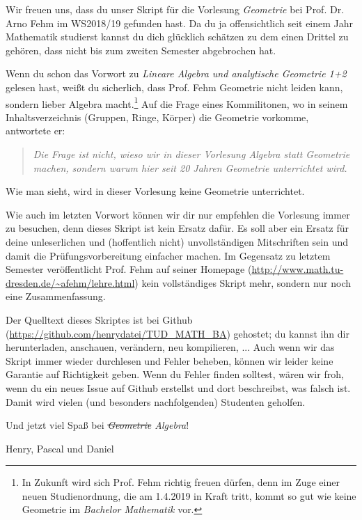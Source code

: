 Wir freuen uns, dass du unser Skript für die Vorlesung \textit{Geometrie} bei Prof. Dr. Arno Fehm im WS2018/19 gefunden hast. Da du ja offensichtlich seit einem Jahr Mathematik studierst kannst du dich glücklich schätzen zu dem einen Drittel zu gehören, dass nicht bis zum zweiten Semester abgebrochen hat.

Wenn du schon das Vorwort zu \textit{Lineare Algebra und analytische Geometrie 1+2} gelesen hast, weißt du sicherlich, dass Prof. Fehm Geometrie nicht leiden kann, sondern lieber Algebra macht.\footnote{In Zukunft wird sich Prof. Fehm richtig freuen dürfen, denn im Zuge einer neuen Studienordnung, die am 1.4.2019 in Kraft tritt, kommt so gut wie keine Geometrie im \textit{Bachelor Mathematik} vor.} Auf die Frage eines Kommilitonen, wo in seinem Inhaltsverzeichnis (Gruppen, Ringe, Körper) die Geometrie vorkomme, antwortete er:
\begin{quote}
	\textit{Die Frage ist nicht, wieso wir in dieser Vorlesung Algebra statt Geometrie machen, sondern warum hier seit 20 Jahren Geometrie unterrichtet wird.}
\end{quote}
Wie man sieht, wird in dieser Vorlesung keine Geometrie unterrichtet.

Wie auch im letzten Vorwort können wir dir nur empfehlen die Vorlesung immer zu besuchen, denn dieses Skript ist kein Ersatz dafür. Es soll aber ein Ersatz für deine unleserlichen und (hoffentlich nicht) unvollständigen Mitschriften sein und damit die Prüfungsvorbereitung einfacher machen. Im Gegensatz zu letztem Semester veröffentlicht Prof. Fehm auf seiner Homepage (\url{http://www.math.tu-dresden.de/~afehm/lehre.html}) kein vollständiges Skript mehr, sondern nur noch eine Zusammenfassung.

Der Quelltext dieses Skriptes ist bei Github (\url{https://github.com/henrydatei/TUD_MATH_BA}) gehostet; du kannst ihn dir herunterladen, anschauen, verändern, neu kompilieren, ... Auch wenn wir das Skript immer wieder durchlesen und Fehler beheben, können wir leider keine Garantie auf Richtigkeit geben. Wenn du Fehler finden solltest, wären wir froh, wenn du ein neues Issue auf Github erstellst und dort beschreibst, was falsch ist. Damit wird vielen (und besonders nachfolgenden) Studenten geholfen.

Und jetzt viel Spaß bei \textit{\sout{Geometrie} Algebra}!

\begin{flushright}
	Henry, Pascal und Daniel
\end{flushright}